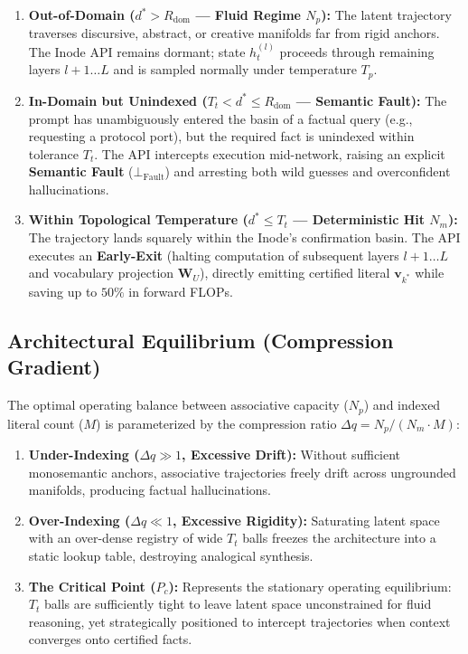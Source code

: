 \documentclass[11pt,a4paper]{article}
\theoremstyle{definition}
\begin{document}
\begin{enumerate}[leftmargin=*, itemsep=2.5pt]
    \item \textbf{Out-of-Domain ($d^* > R_{\mathrm{dom}}$ --- Fluid Regime $N_p$):} The latent trajectory traverses discursive, abstract, or creative manifolds far from rigid anchors. The Inode API remains dormant; state $h_t^{(l)}$ proceeds through remaining layers $l+1 \dots L$ and is sampled normally under temperature $T_p$.
    \item \textbf{In-Domain but Unindexed ($T_t < d^* \le R_{\mathrm{dom}}$ --- Semantic Fault):} The prompt has unambiguously entered the basin of a factual query (e.g., requesting a protocol port), but the required fact is unindexed within tolerance $T_t$. The API intercepts execution mid-network, raising an explicit \textbf{Semantic Fault} ($\bot_{\mathrm{Fault}}$) and arresting both wild guesses and overconfident hallucinations.
    \item \textbf{Within Topological Temperature ($d^* \le T_t$ --- Deterministic Hit $N_m$):} The trajectory lands squarely within the Inode's confirmation basin. The API executes an \textbf{Early-Exit} (halting computation of subsequent layers $l+1 \dots L$ and vocabulary projection $\mathbf{W}_U$), directly emitting certified literal $\mathbf{v}_{k^*}$ while saving up to $50\%$ in forward FLOPs.
\end{enumerate}

\subsection{Architectural Equilibrium (Compression Gradient)}

The optimal operating balance between associative capacity ($N_p$) and indexed literal count ($M$) is parameterized by the compression ratio $\Delta q = N_p / (N_m \cdot M)$:

\begin{enumerate}[leftmargin=*, itemsep=2.0pt]
    \item \textbf{Under-Indexing ($\Delta q \gg 1$, Excessive Drift):} Without sufficient monosemantic anchors, associative trajectories freely drift across ungrounded manifolds, producing factual hallucinations.
    \item \textbf{Over-Indexing ($\Delta q \ll 1$, Excessive Rigidity):} Saturating latent space with an over-dense registry of wide $T_t$ balls freezes the architecture into a static lookup table, destroying analogical synthesis.
    \item \textbf{The Critical Point ($P_c$):} Represents the stationary operating equilibrium: $T_t$ balls are sufficiently tight to leave latent space unconstrained for fluid reasoning, yet strategically positioned to intercept trajectories when context converges onto certified facts.
\end{enumerate}
\end{document}
